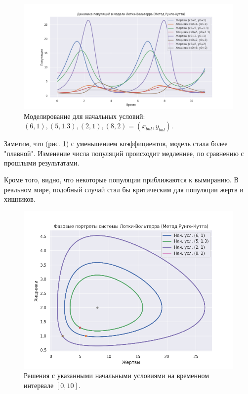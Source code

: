\begin{figure}[h]  %
	\centering
	\includegraphics[width=1\textwidth]{imgs/pop_2.png}  %
	\caption{Моделирование для начальных условий: $(6, 1), (5,1.3), (2,1), (8,2) = (x_{bal}, y_{bal})$.}  %
	\label{fig:pop_2}  %
\end{figure}

Заметим, что (рис. \ref{fig:pop_2}) с уменьшением коэффициентов, модель стала более "плавной". Изменение числа популяций происходит медленнее, по сравнению с прошлыми результатами. 

Кроме того, видно, что некоторые популяции приближаются к вымиранию. В реальном мире, подобный случай стал бы критическим для популяции жертв и хищников.

\begin{figure}[h]  %
	\centering
	\includegraphics[width=1\textwidth]{imgs/phase_2.png}  %
	\caption{Решения с указанными начальными условиями на временном интервале $[0,10]$.}  %
	\label{fig:phase_2}  %
\end{figure}


